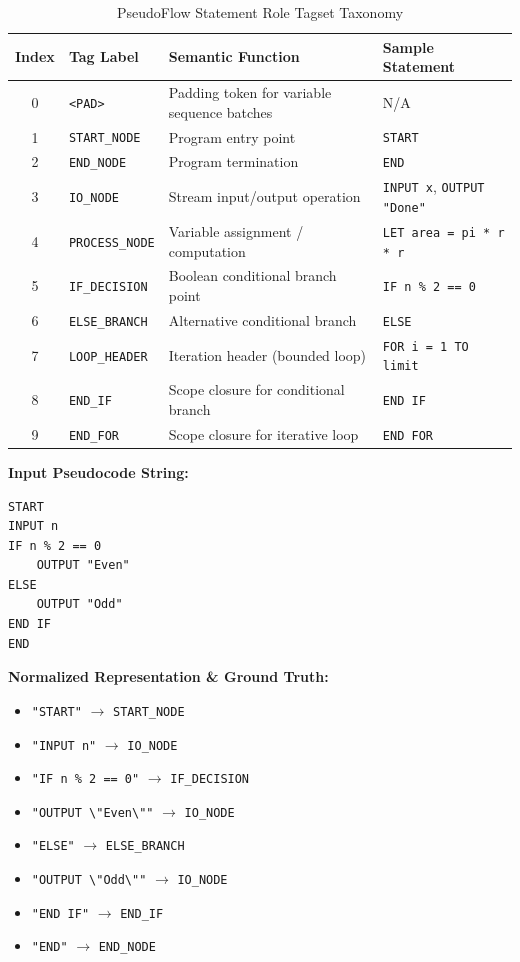 \documentclass[11pt,a4paper]{article}
\begin{document}
\begin{table}[htbp]
\centering
\caption{PseudoFlow Statement Role Tagset Taxonomy}
\label{tab:tagset}
\begin{tabularx}{\textwidth}{@{}cllX@{}}
\toprule
\textbf{Index} & \textbf{Tag Label} & \textbf{Semantic Function} & \textbf{Sample Statement} \\ \midrule
0 & \texttt{<PAD>} & Padding token for variable sequence batches & N/A \\
1 & \texttt{START\_NODE} & Program entry point & \texttt{START} \\
2 & \texttt{END\_NODE} & Program termination & \texttt{END} \\
3 & \texttt{IO\_NODE} & Stream input/output operation & \texttt{INPUT x}, \texttt{OUTPUT "Done"} \\
4 & \texttt{PROCESS\_NODE} & Variable assignment / computation & \texttt{LET area = pi * r * r} \\
5 & \texttt{IF\_DECISION} & Boolean conditional branch point & \texttt{IF n \% 2 == 0} \\
6 & \texttt{ELSE\_BRANCH} & Alternative conditional branch & \texttt{ELSE} \\
7 & \texttt{LOOP\_HEADER} & Iteration header (bounded loop) & \texttt{FOR i = 1 TO limit} \\
8 & \texttt{END\_IF} & Scope closure for conditional branch & \texttt{END IF} \\
9 & \texttt{END\_FOR} & Scope closure for iterative loop & \texttt{END FOR} \\ \bottomrule
\end{tabularx}
\end{table}

\begin{nlpexample}
\textbf{Input Pseudocode String:}
\begin{verbatim}
START
INPUT n
IF n % 2 == 0
    OUTPUT "Even"
ELSE
    OUTPUT "Odd"
END IF
END
\end{verbatim}
\textbf{Normalized Representation \& Ground Truth:}
\begin{itemize}
    \item \texttt{"START"} $\longrightarrow$ \texttt{START\_NODE}
    \item \texttt{"INPUT n"} $\longrightarrow$ \texttt{IO\_NODE}
    \item \texttt{"IF n \% 2 == 0"} $\longrightarrow$ \texttt{IF\_DECISION}
    \item \texttt{"OUTPUT \textbackslash"Even\textbackslash""} $\longrightarrow$ \texttt{IO\_NODE}
    \item \texttt{"ELSE"} $\longrightarrow$ \texttt{ELSE\_BRANCH}
    \item \texttt{"OUTPUT \textbackslash"Odd\textbackslash""} $\longrightarrow$ \texttt{IO\_NODE}
    \item \texttt{"END IF"} $\longrightarrow$ \texttt{END\_IF}
    \item \texttt{"END"} $\longrightarrow$ \texttt{END\_NODE}
\end{itemize}
\end{nlpexample}
\end{document}
